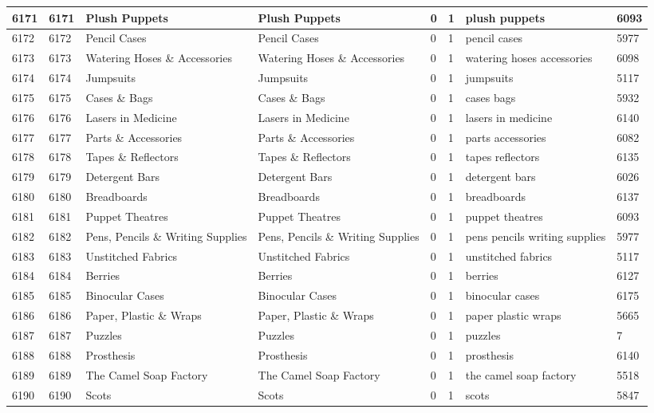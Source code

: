 \begin{longtable}{|l|l|l|l|l|l|l|l|}
6171 & 6171 & Plush Puppets & Plush Puppets & 0 & 1 & plush puppets & 6093 \\ \hline 
6172 & 6172 & Pencil Cases & Pencil Cases & 0 & 1 & pencil cases & 5977 \\ \hline 
6173 & 6173 & Watering Hoses \& Accessories & Watering Hoses \& Accessories & 0 & 1 & watering hoses accessories & 6098 \\ \hline 
6174 & 6174 & Jumpsuits & Jumpsuits & 0 & 1 & jumpsuits & 5117 \\ \hline 
6175 & 6175 & Cases \& Bags & Cases \& Bags & 0 & 1 & cases bags & 5932 \\ \hline 
6176 & 6176 & Lasers in Medicine & Lasers in Medicine & 0 & 1 & lasers in medicine & 6140 \\ \hline 
6177 & 6177 & Parts \& Accessories & Parts \& Accessories & 0 & 1 & parts accessories & 6082 \\ \hline 
6178 & 6178 & Tapes \& Reflectors & Tapes \& Reflectors & 0 & 1 & tapes reflectors & 6135 \\ \hline 
6179 & 6179 & Detergent Bars & Detergent Bars & 0 & 1 & detergent bars & 6026 \\ \hline 
6180 & 6180 & Breadboards & Breadboards & 0 & 1 & breadboards & 6137 \\ \hline 
6181 & 6181 & Puppet Theatres & Puppet Theatres & 0 & 1 & puppet theatres & 6093 \\ \hline 
6182 & 6182 & Pens, Pencils \& Writing Supplies & Pens, Pencils \& Writing Supplies & 0 & 1 & pens pencils writing supplies & 5977 \\ \hline 
6183 & 6183 & Unstitched Fabrics & Unstitched Fabrics & 0 & 1 & unstitched fabrics & 5117 \\ \hline 
6184 & 6184 & Berries & Berries & 0 & 1 & berries & 6127 \\ \hline 
6185 & 6185 & Binocular Cases & Binocular Cases & 0 & 1 & binocular cases & 6175 \\ \hline 
6186 & 6186 & Paper, Plastic \& Wraps & Paper, Plastic \& Wraps & 0 & 1 & paper plastic wraps & 5665 \\ \hline 
6187 & 6187 & Puzzles & Puzzles & 0 & 1 & puzzles & 7 \\ \hline 
6188 & 6188 & Prosthesis & Prosthesis & 0 & 1 & prosthesis & 6140 \\ \hline 
6189 & 6189 & The Camel Soap Factory & The Camel Soap Factory & 0 & 1 & the camel soap factory & 5518 \\ \hline 
6190 & 6190 & Scots & Scots & 0 & 1 & scots & 5847 \\ \hline 

\end{longtable}
